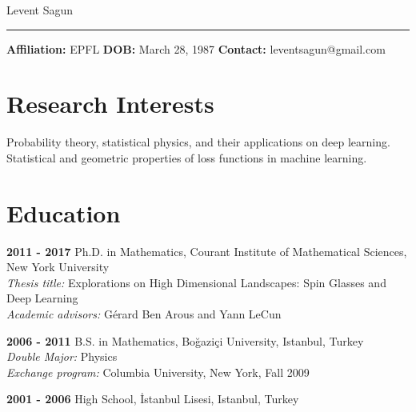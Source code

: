 \documentclass[10pt,letterpaper]{article}
\renewenvironment{itemize}
{
\begin{list}{}{\setlength{\leftmargin}{1.5em}}
}
{
  \end{list}
}
\begin{document}
{\huge Levent Sagun}

\noindent\rule{6.7in}{0.4pt}

\textbf{ Affiliation:} EPFL \textbf{ DOB:} March 28, 1987 \textbf{ Contact:} leventsagun@gmail.com

\section*{Research Interests}
\begin{itemize}
\item Probability theory, statistical physics, and their applications on deep learning. \\ Statistical and geometric properties of loss functions in machine learning.
\end{itemize}

\section*{Education}
\begin{itemize}
\item \textbf{2011 - 2017 } Ph.D. in Mathematics, Courant Institute of Mathematical Sciences, New York University \\ 
  \hspace*{2cm} \textit{ Thesis title: }{Explorations on High Dimensional Landscapes: Spin Glasses and Deep Learning} \\
  \hspace*{2cm} \textit{ Academic advisors: }{G\'erard Ben Arous and Yann LeCun}

\item \textbf{2006 - 2011 } B.S. in Mathematics, Bo\u{g}azi\c{c}i University, Istanbul, Turkey \\
    \hspace*{2cm} \textit{ Double Major:} Physics \\ %
    \hspace*{2cm} \textit{ Exchange program: }{Columbia University, New York, Fall 2009} %
 
\item \textbf{2001 - 2006 } High School, \.{I}stanbul Lisesi, Istanbul, Turkey%

\end{itemize}
\end{document}
